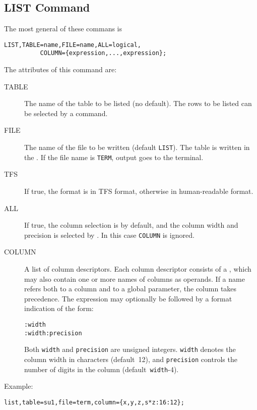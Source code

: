 \subsection{LIST Command}
The most general of these commans is
\begin{verbatim}
LIST,TABLE=name,FILE=name,ALL=logical,
          COLUMN={expression,...,expression};
\end{verbatim}
The attributes of this command are:
\begin{description}
\item[TABLE]
  The name of the table to be listed (no default). 
  The rows to be listed can be selected by a
   command.
\item[FILE]
  The name of the file to be written (default \texttt{LIST}).
  The table is written in the .
  If the file name is \texttt{TERM}, output goes to the terminal.
\item[TFS]
  If true, the format is in TFS format, otherwise in human-readable
  format. 
\item[ALL]
  If true, the column selection is by default, and the column width
  and precision is selected by \opal .
  In this case \texttt{COLUMN} is ignored.
\item[COLUMN]
  A list of column descriptors.
  Each column descriptor consists of a ,
  which may also contain one or more names of columns as operands.
  If a name refers both to a column and to a global parameter,
  the column takes precedence.
  The expression may optionally be followed by a format indication of
  the form:
\begin{verbatim}
:width
:width:precision
\end{verbatim}
  Both \texttt{width} and \texttt{precision} are unsigned integers.
  \texttt{width} denotes the column width in characters (default~12),
  and \texttt{precision} controls the number of digits in the column
  (default~\texttt{width}-4).
\end{description}
Example:
\begin{verbatim}
list,table=su1,file=term,column={x,y,z,s*z:16:12};
\end{verbatim}

